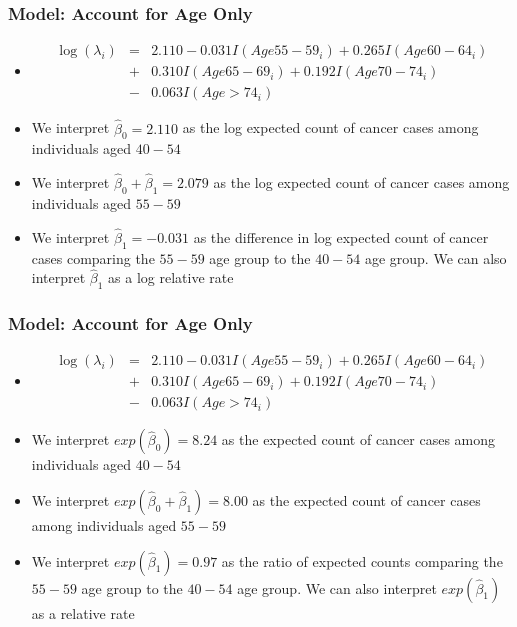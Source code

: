 \documentclass[10pt,xcolor={svgnames},t]{beamer}
\begin{document}
\begin{frame}
	\frametitle{Model: Account for Age Only}
	
	\begin{itemize}
		\item[]	\begin{eqnarray*}
			\log(\lambda_i ) &=& 2.110 -0.031 I(Age55-59_i)+0.265 I(Age60-64_i) \\
			&+&0.310 I(Age65-69_i)+0.192 I(Age70-74_i)\\
			&-&0.063 I(Age>74_i)
		\end{eqnarray*} 
		
		\item We interpret $\hat{\beta}_0=2.110$ as the log expected count of cancer cases among individuals aged $40-54$
				\bigskip
		\item We interpret $\hat{\beta}_0+\hat{\beta}_1=2.079$ as the log expected count of cancer cases among individuals aged $55-59$
				\bigskip
		\item We interpret $\hat{\beta}_1=-0.031$ as the difference in log expected count of cancer cases comparing the $55-59$ age group to the $40-54$ age group. We can also interpret $\hat{\beta}_1$ as a log relative rate
	\end{itemize}
	
	
\end{frame}
%

%
\begin{frame}
	\frametitle{Model: Account for Age Only}
	
	\begin{itemize}
		\item[]	\begin{eqnarray*}
			\log(\lambda_i ) &=& 2.110 -0.031 I(Age55-59_i)+0.265 I(Age60-64_i) \\
			&+&0.310 I(Age65-69_i)+0.192 I(Age70-74_i)\\
			&-&0.063 I(Age>74_i)
		\end{eqnarray*} 
		
		\item We interpret $exp(\hat{\beta}_0)=8.24$ as the expected count of cancer cases among individuals aged $40-54$
				\bigskip
		\item We interpret $exp(\hat{\beta}_0+\hat{\beta}_1)=8.00$ as the expected count of cancer cases among individuals aged $55-59$
				\bigskip
		\item We interpret $exp(\hat{\beta}_1)=0.97$ as the ratio of expected counts comparing the $55-59$ age group to the $40-54$ age group. We can also interpret $exp(\hat{\beta}_1)$ as a relative rate
	\end{itemize}
	
	
\end{frame}
%
\end{document}
